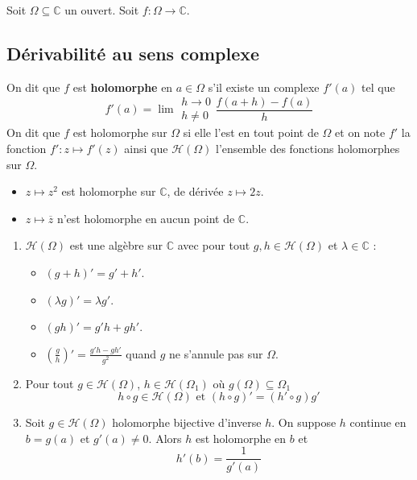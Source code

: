




	Soit $\Omega \subseteq \mathbb{C}$ un ouvert. Soit $f : \Omega \rightarrow \mathbb{C}$.

	\subsection{Dérivabilité au sens complexe}


	\begin{definition}
		On dit que $f$ est \textbf{holomorphe} en $a \in \Omega$ s'il existe un complexe $f'(a)$ tel que
		\[ f'(a) = \lim{\substack{h \rightarrow 0 \\ h \neq 0}} \frac{f(a+h) - f(a)}{h} \]
		On dit que $f$ est holomorphe sur $\Omega$ si elle l'est en tout point de $\Omega$ et on note $f'$ la fonction $f' : z \mapsto f'(z)$ ainsi que $\mathcal{H}(\Omega)$ l'ensemble des fonctions holomorphes sur $\Omega$.
	\end{definition}

	\begin{example}
		\begin{itemize}
			\item $z \mapsto z^2$ est holomorphe sur $\mathbb{C}$, de dérivée $z \mapsto 2z$.
			\item $z \mapsto \overline{z}$ n'est holomorphe en aucun point de $\mathbb{C}$.
		\end{itemize}
	\end{example}

	\begin{proposition}
		\begin{enumerate}[label=(\roman*)]
			\item $\mathcal{H}(\Omega)$ est une algèbre sur $\mathbb{C}$ avec pour tout $g, h \in \mathcal{H}(\Omega)$ et $\lambda \in \mathbb{C}$ :
			\begin{itemize}
				\item $(g+h)' = g'+h'$.
				\item $(\lambda g)' = \lambda g'$.
				\item $(gh)' = g'h + gh'$.
				\item $\left( \frac{g}{h} \right)' = \frac{g'h - gh'}{g^2}$ quand $g$ ne s'annule pas sur $\Omega$.
			\end{itemize}
			\item Pour tout $g \in \mathcal{H}(\Omega)$, $h \in \mathcal{H}(\Omega_1)$ où $g(\Omega) \subseteq \Omega_1$
			\[ h \circ g \in \mathcal{H}(\Omega) \text{ et } (h \circ g)' = (h' \circ g) g' \]
			\item Soit $g \in \mathcal{H}(\Omega)$ holomorphe bijective d'inverse $h$. On suppose $h$ continue en $b = g(a)$ et $g'(a) \neq 0$. Alors $h$ est holomorphe en $b$ et
			\[ h'(b) = \frac{1}{g'(a)} \]
		\end{enumerate}
	\end{proposition}

